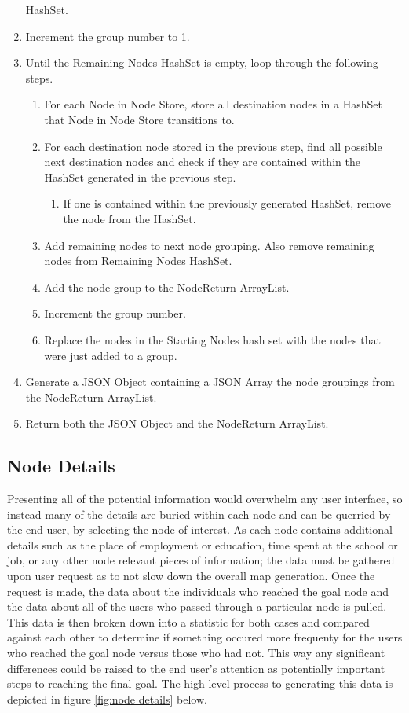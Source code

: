 \begin{enumerate}
   HashSet.
   \item Increment the group number to 1.
   \item Until the Remaining Nodes HashSet is empty, loop through the following
   steps.
   \begin{enumerate}
     \item For each Node in Node Store, store all destination nodes in a HashSet
     that Node in Node Store transitions to.
     \item For each destination node stored in the previous step, find all
     possible next destination nodes and check if they are contained within the
     HashSet generated in the previous step.
     \begin{enumerate}
       \item If one is contained within the previously generated HashSet, remove
       the node from the HashSet.
     \end{enumerate}
     \item Add remaining nodes to next node grouping.  Also remove remaining
     nodes from Remaining Nodes HashSet.
     \item Add the node group to the NodeReturn ArrayList.
     \item Increment the group number.
     \item Replace the nodes in the Starting Nodes hash set with the nodes that
     were just added to a group.
   \end{enumerate} 
   \item Generate a JSON Object containing a JSON Array the node groupings from
   the NodeReturn ArrayList.
   \item Return both the JSON Object and the NodeReturn ArrayList.
 \end{enumerate}



\subsection{Node Details}
Presenting all of the potential information would overwhelm any user interface,
so instead many of the details are buried within each node and can be querried
by the end user, by selecting the node of interest.  As each node contains
additional details such as the place of employment or education, time spent at
the school or job, or any other node relevant pieces of information; the data
must be gathered upon user request as to not slow down the overall map
generation.  Once the request is made, the data about the individuals who
reached the goal node and the data about all of the users who passed through a
particular node is pulled.  This data is then broken down into a statistic for
both cases and compared against each other to determine if something occured
more frequenty for the users who reached the goal node versus those who had not.
This way any significant differences could be raised to the end user's attention
as potentially important steps to reaching the final goal.  The high level
process to generating this data is depicted in figure \ref{fig:node details}
below.

